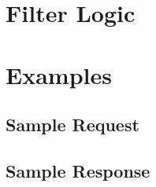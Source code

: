 \documentclass[12pt,a4paper]{article}
\begin{document}
\section{Filter Logic}

\section{Examples}

\subsection{Sample Request}

\subsection{Sample Response}
\end{document}
